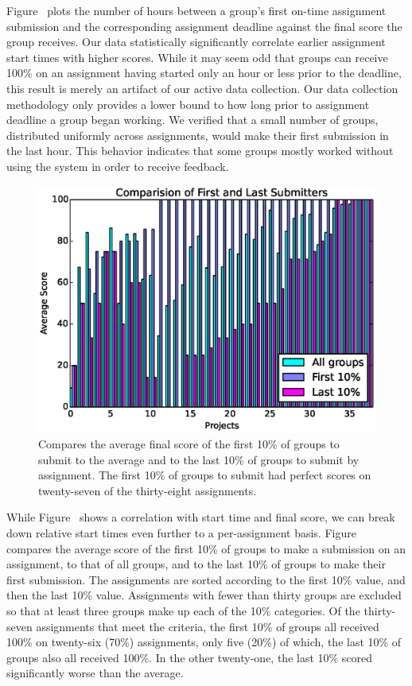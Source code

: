 Figure~ plots the number of hours between a
group's first on-time assignment submission and the corresponding assignment
deadline against the final score the group receives. Our data statistically
significantly correlate earlier assignment start times with higher
scores. While it may seem odd that groups can receive 100\% on an assignment
having started only an hour or less prior to the deadline, this result is
merely an artifact of our active data collection. Our data collection
methodology only provides a lower bound to how long prior to assignment
deadline a group began working. We verified that a small number of groups,
distributed uniformly across assignments, would make their first submission in
the last hour. This behavior indicates that some groups mostly worked without
using the system in order to receive feedback.

\begin{figure}[!t]
\centering
\includegraphics[width=5.25in]{graphs/Comparision_of_First_and_Last_Submitters.eps}
\caption{Compares the average final score of the first 10\% of groups to submit
  to the average and to the last 10\% of groups to submit by assignment. The
  first 10\% of groups to submit had perfect scores on twenty-seven of the
  thirty-eight assignments.}
\end{figure}

While Figure~ shows a correlation with start
time and final score, we can break down relative start times even further to a
per-assignment basis. Figure~ compares the average
score of the first 10\% of groups to make a submission on an assignment, to
that of all groups, and to the last 10\% of groups to make their first
submission. The assignments are sorted according to the first 10\% value, and
then the last 10\% value. Assignments with fewer than thirty groups are
excluded so that at least three groups make up each of the 10\% categories. Of
the thirty-seven assignments that meet the criteria, the first 10\% of groups
all received 100\% on twenty-six (70\%) assignments, only five (20\%) of which,
the last 10\% of groups also all received 100\%. In the other twenty-one, the
last 10\% scored significantly worse than the average.

